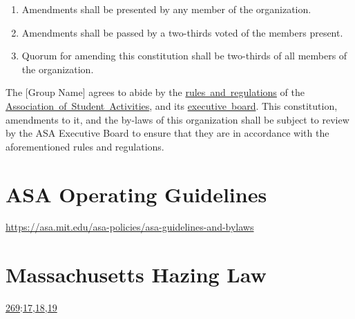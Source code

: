 \documentclass[12pt]{article}
\def\groupname{[Group Name]\xspace}
\begin{document}
\begin{enumerate}
    \item Amendments shall be presented by any member of the organization.

    \item Amendments shall be passed by a two-thirds voted of the members present.

    \item Quorum for amending this constitution shall be two-thirds of all members of the organization.
\end{enumerate}

The \groupname agrees to abide by the \href{https://asa.mit.edu/asa-policies}{rules~and~regulations} of the \href{https://asa.mit.edu/}{Association~of~Student~Activities}, and its \href{https://asa.mit.edu/about-asa/board-members}{executive~board}.
This constitution, amendments to it, and the by-laws of this organization shall be subject to review by the ASA Executive Board to ensure that they are in accordance with the aforementioned rules and regulations.

\section{ASA Operating Guidelines}
\url{https://asa.mit.edu/asa-policies/asa-guidelines-and-bylaws}

\section{Massachusetts Hazing Law}
\href{https://malegislature.gov/Laws/GeneralLaws/PartIV/TitleI/Chapter269}{269}:\href{https://malegislature.gov/Laws/GeneralLaws/PartIV/TitleI/Chapter269/Section17}{17},\href{https://malegislature.gov/Laws/GeneralLaws/PartIV/TitleI/Chapter269/Section18}{18},\href{https://malegislature.gov/Laws/GeneralLaws/PartIV/TitleI/Chapter269/Section19}{19}
\end{document}
